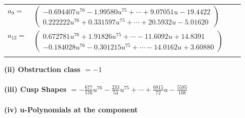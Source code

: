 \documentclass[1p]{elsarticle_modified}
\theoremstyle{definition}
\begin{document}
\begin{tabular}{m{7pt} m{180pt} m{7pt} m{180pt} }
\flushright $a_{9}=$&$\begin{pmatrix}-0.694407 u^{76}-1.99580 u^{75}+\cdots+9.07051 u-19.4422\\0.222222 u^{76}+0.331597 u^{75}+\cdots+20.5932 u-5.01620\end{pmatrix}$ \\
\flushright $a_{12}=$&$\begin{pmatrix}0.672781 u^{76}+1.91826 u^{75}+\cdots-11.6092 u+14.8391\\-0.184028 u^{76}-0.301215 u^{75}+\cdots-14.0162 u+3.60880\end{pmatrix}$\\&\end{tabular}
\flushleft \textbf{(ii) Obstruction class $= -1$}\\~\\
\flushleft \textbf{(iii) Cusp Shapes $= -\frac{677}{576} u^{76}-\frac{233}{54} u^{75}+\cdots+\frac{6815}{72} u-\frac{5585}{108}$}\\~\\
\newpage\renewcommand{\arraystretch}{1}
\flushleft \textbf{(iv) u-Polynomials at the component}\newline \\
\end{document}
